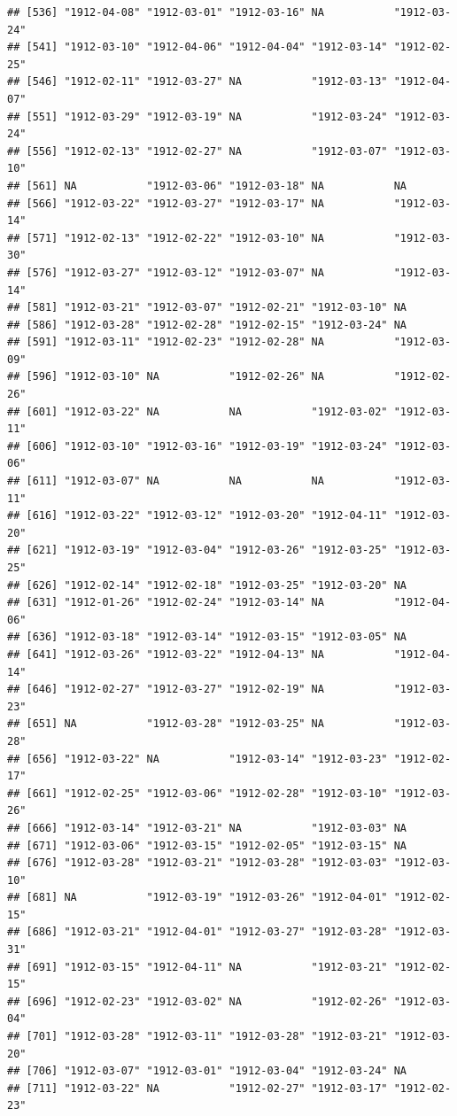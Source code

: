\documentclass[11pt,]{book}
\begin{document}
\begin{verbatim}
## [536] "1912-04-08" "1912-03-01" "1912-03-16" NA           "1912-03-24"
## [541] "1912-03-10" "1912-04-06" "1912-04-04" "1912-03-14" "1912-02-25"
## [546] "1912-02-11" "1912-03-27" NA           "1912-03-13" "1912-04-07"
## [551] "1912-03-29" "1912-03-19" NA           "1912-03-24" "1912-03-24"
## [556] "1912-02-13" "1912-02-27" NA           "1912-03-07" "1912-03-10"
## [561] NA           "1912-03-06" "1912-03-18" NA           NA          
## [566] "1912-03-22" "1912-03-27" "1912-03-17" NA           "1912-03-14"
## [571] "1912-02-13" "1912-02-22" "1912-03-10" NA           "1912-03-30"
## [576] "1912-03-27" "1912-03-12" "1912-03-07" NA           "1912-03-14"
## [581] "1912-03-21" "1912-03-07" "1912-02-21" "1912-03-10" NA          
## [586] "1912-03-28" "1912-02-28" "1912-02-15" "1912-03-24" NA          
## [591] "1912-03-11" "1912-02-23" "1912-02-28" NA           "1912-03-09"
## [596] "1912-03-10" NA           "1912-02-26" NA           "1912-02-26"
## [601] "1912-03-22" NA           NA           "1912-03-02" "1912-03-11"
## [606] "1912-03-10" "1912-03-16" "1912-03-19" "1912-03-24" "1912-03-06"
## [611] "1912-03-07" NA           NA           NA           "1912-03-11"
## [616] "1912-03-22" "1912-03-12" "1912-03-20" "1912-04-11" "1912-03-20"
## [621] "1912-03-19" "1912-03-04" "1912-03-26" "1912-03-25" "1912-03-25"
## [626] "1912-02-14" "1912-02-18" "1912-03-25" "1912-03-20" NA          
## [631] "1912-01-26" "1912-02-24" "1912-03-14" NA           "1912-04-06"
## [636] "1912-03-18" "1912-03-14" "1912-03-15" "1912-03-05" NA          
## [641] "1912-03-26" "1912-03-22" "1912-04-13" NA           "1912-04-14"
## [646] "1912-02-27" "1912-03-27" "1912-02-19" NA           "1912-03-23"
## [651] NA           "1912-03-28" "1912-03-25" NA           "1912-03-28"
## [656] "1912-03-22" NA           "1912-03-14" "1912-03-23" "1912-02-17"
## [661] "1912-02-25" "1912-03-06" "1912-02-28" "1912-03-10" "1912-03-26"
## [666] "1912-03-14" "1912-03-21" NA           "1912-03-03" NA          
## [671] "1912-03-06" "1912-03-15" "1912-02-05" "1912-03-15" NA          
## [676] "1912-03-28" "1912-03-21" "1912-03-28" "1912-03-03" "1912-03-10"
## [681] NA           "1912-03-19" "1912-03-26" "1912-04-01" "1912-02-15"
## [686] "1912-03-21" "1912-04-01" "1912-03-27" "1912-03-28" "1912-03-31"
## [691] "1912-03-15" "1912-04-11" NA           "1912-03-21" "1912-02-15"
## [696] "1912-02-23" "1912-03-02" NA           "1912-02-26" "1912-03-04"
## [701] "1912-03-28" "1912-03-11" "1912-03-28" "1912-03-21" "1912-03-20"
## [706] "1912-03-07" "1912-03-01" "1912-03-04" "1912-03-24" NA          
## [711] "1912-03-22" NA           "1912-02-27" "1912-03-17" "1912-02-23"

\end{verbatim}
\end{document}
